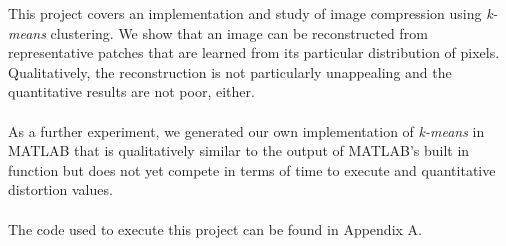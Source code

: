 \documentclass[]{../ncmathy}
\begin{document}
This project covers an implementation and study of image compression using \textit{k-means} clustering. We show that an image can be reconstructed from representative patches that are learned from its particular distribution of pixels. Qualitatively, the reconstruction is not particularly unappealing and the quantitative results are not poor, either.
\\\\
As a further experiment, we generated our own implementation of \textit{k-means} in MATLAB that is qualitatively similar to the output of MATLAB's built in  function but does not yet compete in terms of time to execute and quantitative distortion values.
\\\\
The code used to execute this project can be found in Appendix A.
\end{document}
